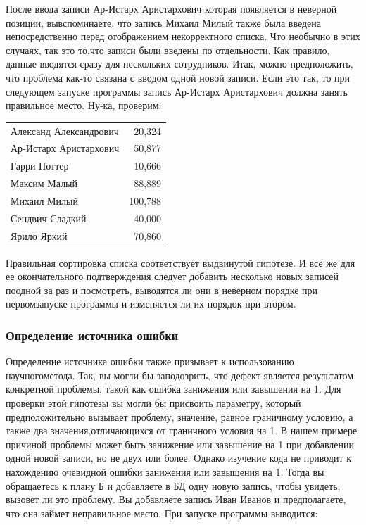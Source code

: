 \documentclass[a4paper]{article}
\begin{document}
После  ввода  записи Ар-Истарх Аристархович  которая  появляется  в  неверной  позиции,  вывспоминаете, что запись Михаил Милый также была введена непосредственно перед отображением  некорректного  списка.  Что  необычно  в  этих  случаях,  так  это  то,что записи были введены по отдельности. Как правило, данные вводятся сразу для нескольких  сотрудников. Итак,  можно  предположить,  что  проблема  как-то  связана  с  вводом  одной  новой записи. Если это так, то при следующем запуске программы запись Ар-Истарх Аристархович должна  занять  правильное  место.  Ну-ка,  проверим:

\begin{tabular}{lr}
Александ Александрович & 20,324 \\
Ар-Истарх Аристархович  &   50,877 \\
Гарри Поттер               &   10,666 \\
Максим Малый           &   88,889 \\
Михаил Милый           &  100,788 \\
Сендвич Сладкий      &   40,000 \\
Ярило Яркий           &   70,860 \\
\end{tabular}

Правильная  сортировка  списка  соответствует  выдвинутой  гипотезе.  И  все  же  для ее  окончательного  подтверждения  следует  добавить  несколько  новых  записей  поодной  за  раз  и  посмотреть,  выводятся  ли  они  в  неверном  порядке  при  первомзапуске  программы  и  изменяется  ли  их  порядок  при  втором.

\subsubsection{Определение источника ошибки}

Определение  источника  ошибки  также  призывает  к  использованию  научногометода.  Так,  вы  могли  бы  заподозрить,  что  дефект  является  результатом  конкретной  проблемы,  такой  как  ошибка  занижения  или  завышения  на  1.  Для  проверки этой  гипотезы  вы  могли  бы  присвоить  параметру,  который  предположительно вызывает  проблему,  значение,  равное  граничному  условию,  а  также  два  значения,отличающихся  от  граничного  условия  на  1. В нашем примере причиной проблемы может быть занижение или завышение на 1  при  добавлении  одной  новой  записи,  но  не  двух  или  более.  Однако  изучение кода  не  приводит  к  нахождению  очевидной  ошибки  занижения  или  завышения на 1. Тогда вы обращаетесь к плану Б и добавляете в БД одну новую запись, чтобы увидеть,  вызовет  ли  это  проблему.  Вы  добавляете  запись  Иван Иванов  и  предполагаете,  что  она  займет  неправильное  место.  При  запуске  программы  выводится:
\end{document}
